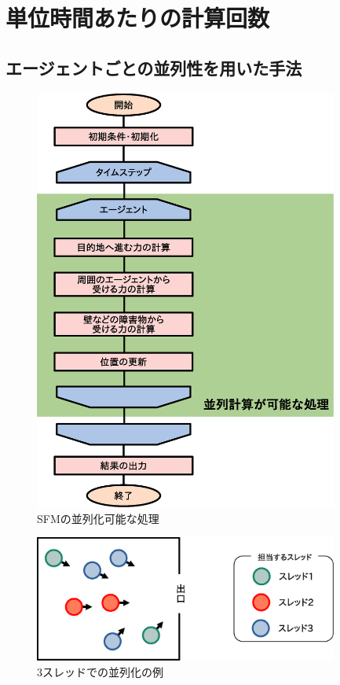 \section{単位時間あたりの計算回数}

\subsection{エージェントごとの並列性を用いた手法}

\begin{figure}[hp]
 \begin{center}
  \includegraphics[width=10cm,clip]{figure/heiretuka_sfm.eps}
  \caption{SFMの並列化可能な処理}
  \label{fig:atigenshou}
 \end{center}
\end{figure}

\begin{figure}[hp]
 \begin{center}
  \includegraphics[width=10cm,clip]{figure/sureddo_heiretu.eps}
  \caption{3スレッドでの並列化の例}
  \label{fig:atigenshou}
 \end{center}
\end{figure}



